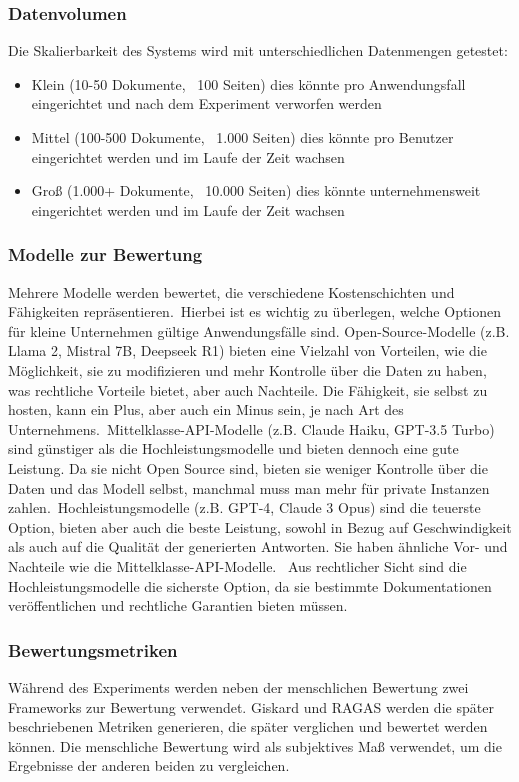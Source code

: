 \subsubsection{Datenvolumen}
Die Skalierbarkeit des Systems wird mit unterschiedlichen Datenmengen getestet:
\begin{itemize}
    \item Klein (10-50 Dokumente, ~100 Seiten) dies könnte pro Anwendungsfall eingerichtet und nach dem Experiment verworfen werden
    \item Mittel (100-500 Dokumente, ~1.000 Seiten) dies könnte pro Benutzer eingerichtet werden und im Laufe der Zeit wachsen
    \item Groß (1.000+ Dokumente, ~10.000 Seiten) dies könnte unternehmensweit eingerichtet werden und im Laufe der Zeit wachsen
\end{itemize}

\subsubsection{Modelle zur Bewertung}
Mehrere Modelle werden bewertet, die verschiedene Kostenschichten und Fähigkeiten repräsentieren.\
Hierbei ist es wichtig zu überlegen, welche Optionen für kleine Unternehmen gültige Anwendungsfälle sind.
Open-Source-Modelle (z.B. Llama 2, Mistral 7B, Deepseek R1) bieten eine Vielzahl von Vorteilen, wie die Möglichkeit, sie zu modifizieren und mehr Kontrolle über die Daten zu haben, was rechtliche Vorteile bietet, aber auch Nachteile. Die Fähigkeit, sie selbst zu hosten, kann ein Plus, aber auch ein Minus sein, je nach Art des Unternehmens.\
Mittelklasse-API-Modelle (z.B. Claude Haiku, GPT-3.5 Turbo) sind günstiger als die Hochleistungsmodelle und bieten dennoch eine gute Leistung. Da sie nicht Open Source sind, bieten sie weniger Kontrolle über die Daten und das Modell selbst, manchmal muss man mehr für private Instanzen zahlen.\
Hochleistungsmodelle (z.B. GPT-4, Claude 3 Opus) sind die teuerste Option, bieten aber auch die beste Leistung, sowohl in Bezug auf Geschwindigkeit als auch auf die Qualität der generierten Antworten. Sie haben ähnliche Vor- und Nachteile wie die Mittelklasse-API-Modelle. \
Aus rechtlicher Sicht sind die Hochleistungsmodelle die sicherste Option, da sie bestimmte Dokumentationen veröffentlichen und rechtliche Garantien bieten müssen.

\subsubsection{Bewertungsmetriken}
Während des Experiments werden neben der menschlichen Bewertung zwei Frameworks zur Bewertung verwendet.
Giskard und RAGAS werden die später beschriebenen Metriken generieren, die später verglichen und bewertet werden können.
Die menschliche Bewertung wird als subjektives Maß verwendet, um die Ergebnisse der anderen beiden zu vergleichen.

